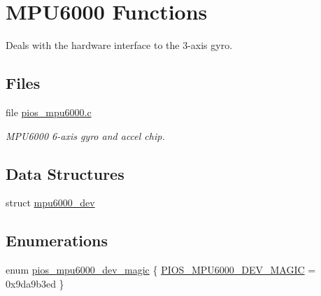 \hypertarget{group___p_i_o_s___m_p_u6000}{\section{M\-P\-U6000 Functions}
\label{group___p_i_o_s___m_p_u6000}
}


Deals with the hardware interface to the 3-\/axis gyro.  


\subsection*{Files}
\begin{DoxyCompactItemize}
\item 
file \hyperlink{pios__mpu6000_8c}{pios\-\_\-mpu6000.\-c}
\begin{DoxyCompactList}\small\item\em M\-P\-U6000 6-\/axis gyro and accel chip. \end{DoxyCompactList}\end{DoxyCompactItemize}
\subsection*{Data Structures}
\begin{DoxyCompactItemize}
\item 
struct \hyperlink{structmpu6000__dev}{mpu6000\-\_\-dev}
\end{DoxyCompactItemize}
\subsection*{Enumerations}
\begin{DoxyCompactItemize}
\item 
enum \hyperlink{group___p_i_o_s___m_p_u6000_gacec1373b8d76d996eacbadde2698c1ee}{pios\-\_\-mpu6000\-\_\-dev\-\_\-magic} \{ \hyperlink{group___p_i_o_s___m_p_u6000_ggacec1373b8d76d996eacbadde2698c1eea5819766babadd675342ed58f91a0d1fd}{P\-I\-O\-S\-\_\-\-M\-P\-U6000\-\_\-\-D\-E\-V\-\_\-\-M\-A\-G\-I\-C} = 0x9da9b3ed
 \}
\end{DoxyCompactItemize}
